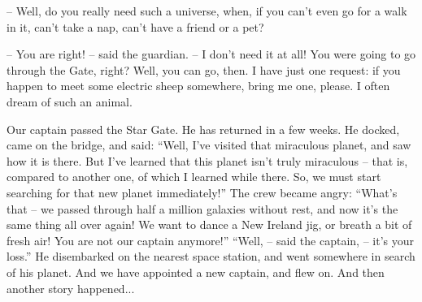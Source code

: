 \documentclass[ebook,oneside,final,openright]{memoir}
\begin{document}
– Well, do you really need such a universe, when, if you can’t even go for a walk in it, can’t take a nap, can’t have a friend or a pet?\par
– You are right! – said the guardian. – I don’t need it at all! You were going to go through the Gate, right? Well, you can go, then. I have just one request: if you happen to meet some electric sheep somewhere, bring me one, please. I often dream of such an animal.\par
Our captain passed the Star Gate. He has returned in a few weeks. He docked, came on the bridge, and said: “Well, I’ve visited that miraculous planet, and saw how it is there. But I’ve learned that this planet isn’t truly miraculous – that is, compared to another one, of which I learned while there. So, we must start searching for that new planet immediately!” The crew became angry: “What’s that – we passed through half a million galaxies without rest, and now it’s the same thing all over again! We want to dance a New Ireland jig, or breath a bit of fresh air! You are not our captain anymore!” “Well, – said the captain, – it’s your loss.” He disembarked on the nearest space station, and went somewhere in search of his planet. And we have appointed a new captain, and flew on. And then another story happened...
\end{document}
